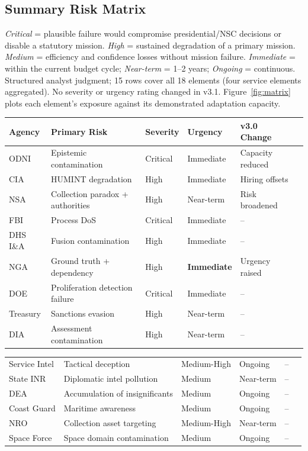 \documentclass[11pt,letterpaper]{article}
\begin{document}
\subsection{Summary Risk Matrix}

\begin{infobox}
\textit{Critical} = plausible failure would compromise presidential/NSC decisions or disable a statutory mission. \textit{High} = sustained degradation of a primary mission. \textit{Medium} = efficiency and confidence losses without mission failure. \textit{Immediate} = within the current budget cycle; \textit{Near-term} = 1--2 years; \textit{Ongoing} = continuous. Structured analyst judgment; 15 rows cover all 18 elements (four service elements aggregated). No severity or urgency rating changed in v3.1. Figure~\ref{fig:matrix} plots each element's exposure against its demonstrated adaptation capacity.
\end{infobox}

\begin{center}
\small
\begin{tabularx}{\linewidth}{ZY{0.86}Y{1.72}Y{0.74}Y{0.74}Y{0.94}}
\toprule
\textbf{Agency} & \textbf{Primary Risk} & \textbf{Severity} & \textbf{Urgency} & \textbf{v3.0 Change} \\
\midrule
ODNI & Epistemic contamination & Critical & Immediate & Capacity reduced \\
CIA & HUMINT degradation & High & Immediate & Hiring offsets \\
NSA & Collection paradox + authorities & High & Near-term & Risk broadened \\
FBI & Process DoS & Critical & Immediate & -- \\
DHS I\&A & Fusion contamination & High & Immediate & -- \\
NGA & Ground truth + dependency & High & \textbf{Immediate} & Urgency raised \\
DOE & Proliferation detection failure & Critical & Immediate & -- \\
Treasury & Sanctions evasion & High & Near-term & -- \\
DIA & Assessment contamination & High & Near-term & -- \\
\end{tabularx}
\end{center}
\begin{center}
\small
\begin{tabularx}{\linewidth}{ZY{0.86}Y{1.72}Y{0.74}Y{0.74}Y{0.94}}
Service Intel & Tactical deception & Medium-High & Ongoing & -- \\
State INR & Diplomatic intel pollution & Medium & Near-term & -- \\
DEA & Accumulation of insignificants & Medium & Ongoing & -- \\
Coast Guard & Maritime awareness & Medium & Ongoing & -- \\
NRO & Collection asset targeting & Medium-High & Near-term & -- \\
Space Force & Space domain contamination & Medium & Ongoing & -- \\
\bottomrule
\end{tabularx}
\end{center}
\end{document}
